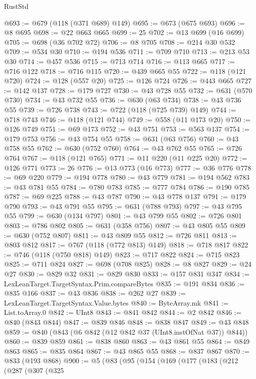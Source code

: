 \begin{lexlean}{RustStd}
\begin{coremodule}
{\begin{coremodule}
{{{{{{{{{{{{{{{{{{{{{{{{{{{{{{{@693 := @679 (@118 (@371 @689) @149)
@695 := @673 (@675 @693)
@696 := @8 @695
@698 := @22 @663 @665
@699 := 25
@702 := @13 @699 (@16 @699)
@705 := @698 (@36 @702 @72)
@706 := @8 @705
@708 := @214 @30 @532
@709 := @534 @30
@710 := @194 @536
@711 := @709 @710
@713 := @213 @53 @30
@714 := @457 @536
@715 := @713 @714
@716 := @113 @665
@717 := @716 @122
@718 := @716 @115
@720 := @439 @665 @55
@722 := @118 (@121 @720)
@724 := @128 (@557 @20)
@725 := @126 @724
@726 := @443 @665
@727 := @142 @137
@728 := @179 @727
@730 := @43 @728 @55
@732 := @631 (@570 @730)
@734 := @43 @732 @55
@736 := @630 (@63 @734)
@738 := @43 @736 @55
@739 := @726 @738
@743 := @722 (@118 (@725 @739) @149)
@744 := @718 @743
@746 := @118 (@121 @744)
@749 := @558 (@11 @173 @20)
@750 := @126 @749
@751 := @69 @173
@752 := @43 @751
@753 := @563 @137
@754 := @179 @753
@756 := @43 @754 @55
@758 := @631 (@63 @756)
@760 := @43 @758 @55
@762 := @630 (@752 @760)
@764 := @43 @762 @55
@765 := @726 @764
@767 := @118 (@121 @765)
@771 := @11 @220 (@11 @225 @20)
@772 := @126 @771
@773 := 26
@776 := @13 @773 (@16 @773)
@777 := @36 @776
@778 := @69 @220
@779 := @194 @778
@780 := @43 @779
@781 := @194 @562
@783 := @43 @781 @55
@784 := @780 @783
@785 := @777 @784
@786 := @190 @785
@787 := @69 @225
@788 := @43 @787
@790 := @43 @778 @137
@791 := @179 @790
@793 := @43 @791 @55
@795 := @631 (@788 @793)
@797 := @43 @795 @55
@799 := @630 (@134 @797)
@801 := @43 @799 @55
@802 := @726 @801
@803 := @786 @802
@805 := @631 (@358 @756)
@807 := @43 @805 @55
@809 := @630 (@752 @807)
@811 := @43 @809 @55
@812 := @726 @811
@813 := @803 @812
@817 := @767 (@118 (@772 @813) @149)
@818 := @718 @817
@822 := @746 (@118 (@750 @818) @149)
@823 := @717 @822
@824 := @715 @823
@825 := @711 @824
@827 := @698 (@708 @825)
@828 := @8 @827
@829 := @24 @27
@830 := @829 @32
@831 := @829 @830
@833 := @157 @831 @347
@834 := LexLeanTarget.TargetSyntax.Prim.compareBytes
@835 := @191 @834
@836 := @835 @166
@837 := @43 @836
@838 := @262 @27
@839 := LexLeanTarget.TargetSyntax.Value.bytes
@840 := ByteArray.mk
@841 := List.toArray.{0}
@842 := UInt8
@843 := @841 @842
@844 := @2 @842
@846 := @840 (@843 @844)
@847 := @839 @846
@848 := @838 @847
@849 := @43 @848
@859 := @840 (@843 (@6 @842 (@12 @842 @37 (UInt8.instOfNat @37)) @844))
@860 := @839 @859
@861 := @838 @860
@863 := @43 @861 @55
@864 := @849 @863
@865 := @835 @864
@867 := @43 @865 @55
@868 := @837 @867
@870 := @833 (@193 @868)
@900 := @5
    (@83
      (@95
        (@154
          (@169
            (@177
              (@183
                (@212
                  (@287
                    (@307
                      (@325
}}}}}}}}}}}}}}}}}}}}}}}}}}}}}}}
\end{coremodule}}
\end{coremodule}
\end{lexlean}

